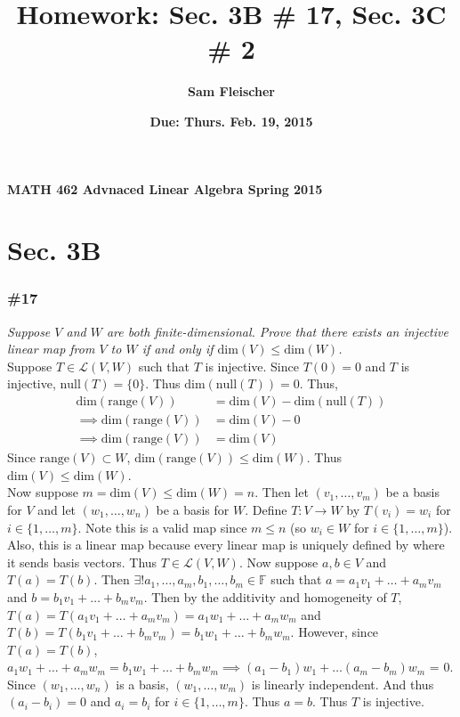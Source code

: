 \documentclass[12pt]{article}
\begin{document}
{\bf MATH 462 \hfill Advnaced Linear Algebra \hfill Spring 2015}

\title{\bf Homework: Sec. 3B \# 17, Sec. 3C \# 2}
\author{\bf Sam Fleischer}
\date{\bf Due: Thurs. Feb. 19, 2015}

{\let\newpage\relax\maketitle}
\maketitle

\section*{Sec. 3B}
\subsubsection*{\#17}
{\it Suppose $V$ and $W$ are both finite-dimensional.  Prove that there exists an injective linear map from $V$ to $W$ if and only if $\text{dim}(V) \leq \text{dim}(W)$.} \\

\noindent Suppose $T \in \mathcal{L}(V, W)$ such that $T$ is injective.  Since $T(0) = 0$ and $T$ is injective, $\text{null}(T) = \{0\}$.  Thus $\text{dim}(\text{null}(T)) = 0$.  Thus,
\begin{align*}
\text{dim}(\text{range}(V)) &= \text{dim}(V) - \text{dim}(\text{null}(T)) \\
\implies \text{dim}(\text{range}(V)) &= \text{dim}(V) - 0 \\
\implies \text{dim}(\text{range}(V)) &= \text{dim}(V)
\end{align*}
Since $\text{range}(V) \subset W$, $\text{dim}(\text{range}(V)) \leq \text{dim}(W)$.  Thus $\text{dim}(V) \leq \text{dim}(W)$. \\

\noindent Now suppose $m = \text{dim}(V) \leq \text{dim}(W) = n$.  Then let $(v_1, \dots, v_m)$ be a basis for $V$ and let $(w_1, \dots, w_n)$  be a basis for $W$.  Define $T:V\rightarrow W$ by $T(v_i) = w_i$ for $i \in \{1, \dots, m\}$.  Note this is a valid map since $m \leq n$ (so $w_i \in W$ for $i \in \{1, \dots, m\}$).  Also, this is a linear map because every linear map is uniquely defined by where it sends basis vectors.  Thus $T \in \mathcal{L}(V, W)$.  Now suppose $a, b \in V$ and $T(a) = T(b)$.  Then $\exists!a_1, \dots, a_m, b_1, \dots, b_m \in \mathbb{F}$ such that $a = a_1v_1 + \dots + a_mv_m$ and $b = b_1v_1 + \dots + b_mv_m$.  Then by the additivity and homogeneity of $T$, $T(a) = T(a_1v_1 + \dots + a_mv_m) = a_1w_1 + \dots + a_mw_m$ and $T(b) = T(b_1v_1 + \dots + b_mv_m) = b_1w_1 + \dots + b_mw_m$.  However, since $T(a) = T(b)$, $a_1w_1 + \dots + a_mw_m = b_1w_1 + \dots + b_mw_m \implies (a_1 - b_1)w_1 + \dots (a_m - b_m)w_m$ = 0.  Since $(w_1, \dots, w_n)$ is a basis, $(w_1, \dots, w_m)$ is linearly independent.  And thus $(a_i - b_i) = 0$ and $a_i = b_i$ for $i \in \{1, \dots, m\}$.  Thus $a = b$.  Thus $T$ is injective. \\
\end{document}
